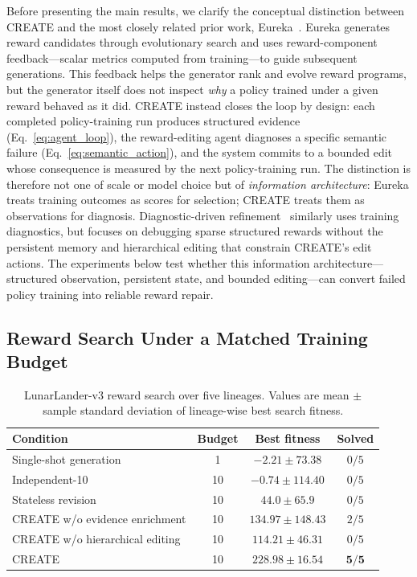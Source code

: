 Before presenting the main results, we clarify the conceptual distinction between CREATE and the most closely related prior work, Eureka~\cite{ma2024eureka}. Eureka generates reward candidates through evolutionary search and uses reward-component feedback---scalar metrics computed from training---to guide subsequent generations. This feedback helps the generator rank and evolve reward programs, but the generator itself does not inspect \emph{why} a policy trained under a given reward behaved as it did. CREATE instead closes the loop by design: each completed policy-training run produces structured evidence (Eq.~\ref{eq:agent_loop}), the reward-editing agent diagnoses a specific semantic failure (Eq.~\ref{eq:semantic_action}), and the system commits to a bounded edit whose consequence is measured by the next policy-training run. The distinction is therefore not one of scale or model choice but of \emph{information architecture}: Eureka treats training outcomes as scores for selection; CREATE treats them as observations for diagnosis. Diagnostic-driven refinement~\cite{wang2026when} similarly uses training diagnostics, but focuses on debugging sparse structured rewards without the persistent memory and hierarchical editing that constrain CREATE's edit actions. The experiments below test whether this information architecture---structured observation, persistent state, and bounded editing---can convert failed policy training into reliable reward repair.

\subsection{Reward Search Under a Matched Training Budget}
\label{sec:reward_search}

\begin{table}[t]
\caption{LunarLander-v3 reward search over five lineages. Values are mean $\pm$ sample standard deviation of lineage-wise best search fitness.}
\label{tab:lander_main}
\centering
\scriptsize
\setlength{\tabcolsep}{2.3pt}
\begin{tabular}{lccc}
\toprule
Condition & Budget & Best fitness & Solved \\
\midrule
Single-shot generation & 1 & $-2.21\pm73.38$ & $0/5$ \\
Independent-10 & 10 & $-0.74\pm114.40$ & $0/5$ \\
Stateless revision & 10 & $44.0\pm65.9$ & $0/5$ \\
CREATE w/o evidence enrichment & 10 & $134.97\pm148.43$ & $2/5$ \\
CREATE w/o hierarchical editing & 10 & $114.21\pm46.31$ & $0/5$ \\
CREATE & 10 & $\mathbf{228.98\pm16.54}$ & $\mathbf{5/5}$ \\
\bottomrule
\end{tabular}
\end{table}

